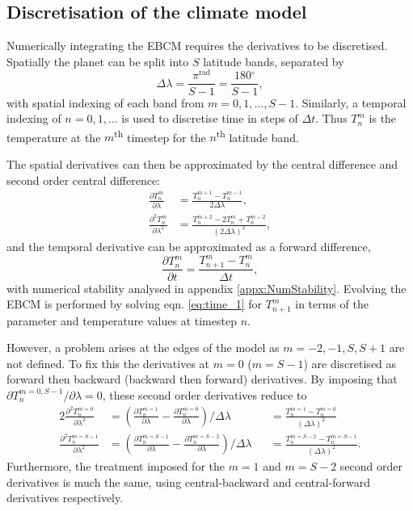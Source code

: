 \documentclass[12pt, onecolumn]{revtex4-2}    %
\newcommand{\radians}{\ensuremath{^{\text{rad}}}}
\newcommand{\degrees}{\ensuremath{^{\circ}}}
\newcommand{\partialderiv}[2]{\frac{\partial {#1}}{\partial {#2}}}
\newcommand{\partialderivsecnd}[2]{\frac{\partial^2 {#1}}{\partial {#2}^2}}
\begin{document}
\subsection{Discretisation of the climate model} \label{ssec:DiscretisationPDE}
Numerically integrating the EBCM requires the derivatives to be discretised.
Spatially the planet can be split into $S$ latitude bands, separated by
\begin{equation}
  \Delta\lambda = \frac{\pi\radians}{S-1} = \frac{180\degrees}{S-1},
\end{equation}
with spatial indexing of each band from $m=0, 1, \dots, S-1$.
Similarly, a temporal indexing of $n=0, 1, \dots$ is used to discretise time in steps of $\Delta t$.
Thus $T^m_n$ is the temperature at the $m$\textsuperscript{th} timestep for the $n$\textsuperscript{th} latitude band.

The spatial derivatives can then be approximated by the central difference and second order central difference:
\begin{align}
  \partialderiv{T^m_n}{\lambda}      & = \frac{T^{m+1}_n - T^{m-1}_n}{2 \Delta\lambda},     \label{eq:space_1}        \\
  \partialderivsecnd{T^m_n}{\lambda} & = \frac{T^{m+2}_n -2T^m_n + T^{m-2}_n}{(2 \Delta\lambda)^2},\label{eq:space_2}
\end{align}
and the temporal derivative can be approximated as a forward difference,
\begin{equation}
  \partialderiv{T^m_n}{t} = \frac{T^m_{n+1} - T^m_n}{\Delta t},\label{eq:time_1}
\end{equation}
with numerical stability analysed in appendix \ref{appx:NumStability}.
Evolving the EBCM is performed by solving eqn. \eqref{eq:time_1} for $T^m_{n+1}$ in terms of the parameter and temperature values at timestep $n$.

However, a problem arises at the edges of the model as $m=-2, -1, S, S+1$ are not defined.
To fix this the derivatives at $m=0$ ($m=S-1$) are discretised as forward then backward (backward then forward) derivatives.
By imposing that ${\partial T^{m=0, S-1}_n}/{\partial \lambda} = 0$, these second order derivatives reduce to
\begin{alignat}{2}
  \partialderivsecnd{T^{m=0}_n}{\lambda}   & = \left(\partialderiv{T^{m=1}_n}{\lambda} - \partialderiv{T^{m=0}_n}{\lambda}\right) / \Delta\lambda     &  & = \frac{T^{m=1}_n - T^{m=0}_n}{(\Delta\lambda)^2}
  \label{eq:forward_backward}                                                                                                                                                                                     \\
  \partialderivsecnd{T^{m=S-1}_n}{\lambda} & = \left(\partialderiv{T^{m=S-1}_n}{\lambda} - \partialderiv{T^{m=S-2}_n}{\lambda}\right) / \Delta\lambda &  & = \frac{T^{m=S-2}_n - T^{m=S-1}_n}{(\Delta\lambda)^2}.
  \label{eq:backward_forward}
\end{alignat}
Furthermore, the treatment imposed for the $m=1$ and $m=S-2$ second order derivatives is much the same, using central-backward and central-forward derivatives respectively.
\end{document}
